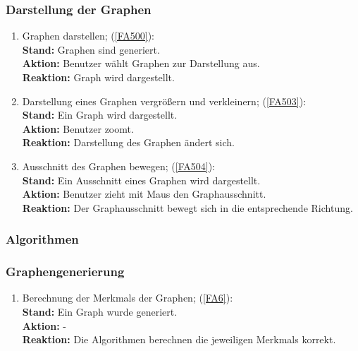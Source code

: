 \documentclass[13pt]{scrreprt}
\begin{document}
\subsubsection{Darstellung der Graphen}
\begin{addmargin}[25pt]{0pt}
	\begin{enumerate} [label=T\arabic*,start=500]
	
		\item Graphen darstellen; (\ref{FA500}):
		\\
		\textbf{Stand:} Graphen sind generiert.
		\\
		\textbf{Aktion:} Benutzer wählt Graphen zur Darstellung aus.
		\\
		\textbf{Reaktion:} Graph wird dargestellt.
		
		\item Darstellung eines Graphen vergrößern und verkleinern; (\ref{FA503}):
		\\
		\textbf{Stand:} Ein Graph wird dargestellt.
		\\
		\textbf{Aktion:} Benutzer zoomt.
		\\
		\textbf{Reaktion:} Darstellung des Graphen ändert sich.
		
		\item Ausschnitt des Graphen bewegen; (\ref{FA504}):
		\\
		\textbf{Stand:} Ein Ausschnitt eines Graphen wird dargestellt.
		\\
		\textbf{Aktion:} Benutzer zieht mit Maus den Graphausschnitt.
		\\
		\textbf{Reaktion:} Der Graphausschnitt bewegt sich in die entsprechende Richtung.
	\end{enumerate}
\end{addmargin}

\subsubsection{Algorithmen}
\subsubsection{Graphengenerierung}
\begin{addmargin}[25pt]{0pt}
	\begin{enumerate} [label=T\arabic*,start=600]
		\item Berechnung der \Glspl{Merkmal} der Graphen; (\ref{FA6}):
		\\
		\textbf{Stand:} Ein Graph wurde generiert.
		\\
		\textbf{Aktion:} -
		\\
		\textbf{Reaktion:} Die Algorithmen berechnen die jeweiligen \Glspl{Merkmal} korrekt.
	\end{enumerate}
\end{addmargin}


\glsaddall
\printnoidxglossaries
\end{document}
